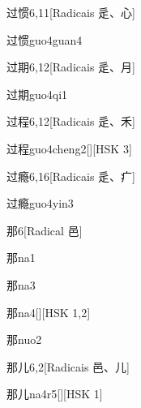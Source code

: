 \begin{entry}{过惯}{6,11}[Radicais ⾡、⼼]
  \begin{phonetics}{过惯}{guo4guan4}
  \end{phonetics}
\end{entry}

\begin{entry}{过期}{6,12}[Radicais ⾡、⽉]
  \begin{phonetics}{过期}{guo4qi1}
  \end{phonetics}
\end{entry}

\begin{entry}{过程}{6,12}[Radicais ⾡、⽲]
  \begin{phonetics}{过程}{guo4cheng2}[][HSK 3]
  \end{phonetics}
\end{entry}

\begin{entry}{过瘾}{6,16}[Radicais ⾡、⽧]
  \begin{phonetics}{过瘾}{guo4yin3}
  \end{phonetics}
\end{entry}

\begin{entry}{那}{6}[Radical ⾢]
  \begin{phonetics}{那}{na1}
  \end{phonetics}
  \begin{phonetics}{那}{na3}
  \end{phonetics}
  \begin{phonetics}{那}{na4}[][HSK 1,2]
  \end{phonetics}
  \begin{phonetics}{那}{nuo2}
  \end{phonetics}
\end{entry}

\begin{entry}{那儿}{6,2}[Radicais ⾢、⼉]
  \begin{phonetics}{那儿}{na4r5}[][HSK 1]
  \end{phonetics}
\end{entry}

